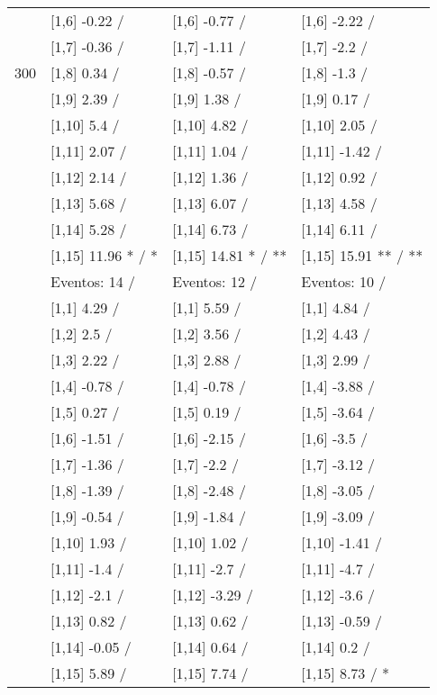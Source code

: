 \begin{table}
\begin{tabular}[t]{llll}
 & {}[1,6] -0.22  / & {}[1,6] -0.77  / & {}[1,6] -2.22  /\\
 & {}[1,7] -0.36  / & {}[1,7] -1.11  / & {}[1,7] -2.2  /\\
300 & {}[1,8] 0.34  / & {}[1,8] -0.57  / & {}[1,8] -1.3  /\\
\addlinespace
 & {}[1,9] 2.39  / & {}[1,9] 1.38  / & {}[1,9] 0.17  /\\
 & {}[1,10] 5.4  / & {}[1,10] 4.82  / & {}[1,10] 2.05  /\\
 & {}[1,11] 2.07  / & {}[1,11] 1.04  / & {}[1,11] -1.42  /\\
 & {}[1,12] 2.14  / & {}[1,12] 1.36  / & {}[1,12] 0.92  /\\
 & {}[1,13] 5.68  / & {}[1,13] 6.07  / & {}[1,13] 4.58  /\\
\addlinespace
 & {}[1,14] 5.28  / & {}[1,14] 6.73  / & {}[1,14] 6.11  /\\
 & {}[1,15] 11.96 * / * & {}[1,15] 14.81 * / ** & {}[1,15] 15.91 ** / **\\
 & Eventos:  14 / & Eventos:  12 / & Eventos:  10 /\\
 & {}[1,1] 4.29  / & {}[1,1] 5.59  / & {}[1,1] 4.84  /\\
 & {}[1,2] 2.5  / & {}[1,2] 3.56  / & {}[1,2] 4.43  /\\
\addlinespace
 & {}[1,3] 2.22  / & {}[1,3] 2.88  / & {}[1,3] 2.99  /\\
 & {}[1,4] -0.78  / & {}[1,4] -0.78  / & {}[1,4] -3.88  /\\
 & {}[1,5] 0.27  / & {}[1,5] 0.19  / & {}[1,5] -3.64  /\\
 & {}[1,6] -1.51  / & {}[1,6] -2.15  / & {}[1,6] -3.5  /\\
 & {}[1,7] -1.36  / & {}[1,7] -2.2  / & {}[1,7] -3.12  /\\
\addlinespace
500 & {}[1,8] -1.39  / & {}[1,8] -2.48  / & {}[1,8] -3.05  /\\
 & {}[1,9] -0.54  / & {}[1,9] -1.84  / & {}[1,9] -3.09  /\\
 & {}[1,10] 1.93  / & {}[1,10] 1.02  / & {}[1,10] -1.41  /\\
 & {}[1,11] -1.4  / & {}[1,11] -2.7  / & {}[1,11] -4.7  /\\
 & {}[1,12] -2.1  / & {}[1,12] -3.29  / & {}[1,12] -3.6  /\\
\addlinespace
 & {}[1,13] 0.82  / & {}[1,13] 0.62  / & {}[1,13] -0.59  /\\
 & {}[1,14] -0.05  / & {}[1,14] 0.64  / & {}[1,14] 0.2  /\\
 & {}[1,15] 5.89  / & {}[1,15] 7.74  / & {}[1,15] 8.73  / *\\
\bottomrule
\end{tabular}
\end{table}
